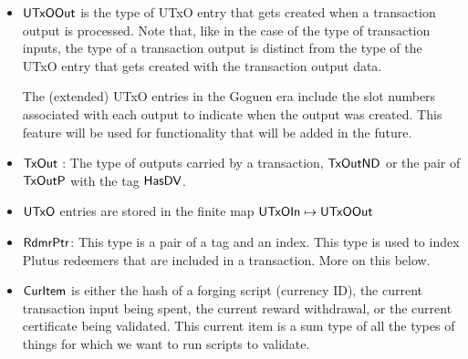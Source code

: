 \begin{itemize}
  \item $\mathsf{UTxOOut}$ is the type of UTxO entry that gets created when a transaction
  output is processed. Note that, like in the case of the type of transaction inputs,
  the type of a transaction output is distinct from the type of the
  UTxO entry that gets created with the transaction output data.

  The (extended) UTxO entries in the Goguen era include the slot numbers associated with each output
  to indicate when the output was created.
  This feature will be used for functionality that will be added in the future.

  \item $\mathsf{TxOut}$ : The type of outputs carried by a transaction,
  $\mathsf{TxOutND}$ or the pair of $\mathsf{TxOutP}$ with the tag $\mathsf{HasDV}$.

  \item $\mathsf{UTxO}$ entries are stored in the finite map $\mathsf{UTxOIn}\mapsto \mathsf{UTxOOut}$

  \item $\mathsf{RdmrPtr}$: This type is a pair of a tag and an index. This type is
  used to index Plutus redeemers that are included in a transaction. More on this
  below.

  \item $\mathsf{CurItem}$ is either the hash of a
  forging script (currency ID), the current transaction input being
  spent, the current reward
  withdrawal, or the current certificate being validated.
  This current item is a sum type of all the types of things for which we want to
  run scripts to validate.

\end{itemize}


